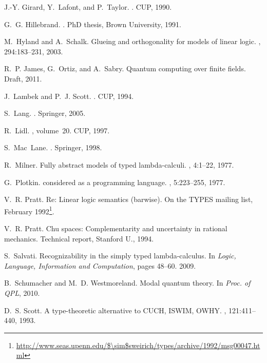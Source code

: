 \documentclass[10pt]{article}
\theoremstyle{plain}
\theoremstyle{definition}
\begin{document}
\begin{thebibliography}{10}
J.-Y. Girard, Y.~Lafont, and P.~Taylor.
.
\newblock CUP, 1990.

G.~G. Hillebrand.
.
\newblock PhD thesis, Brown University, 1991.

M.~Hyland and A.~Schalk.
\newblock Glueing and orthogonality for models of linear logic.
, 294:183--231, 2003.

R.~P. James, G.~Ortiz, and A.~Sabry.
\newblock Quantum computing over finite fields.
\newblock Draft, 2011.

J.~Lambek and P.~J. Scott.
.
\newblock CUP, 1994.

S.~Lang.
.
\newblock Springer, 2005.

R.~Lidl.
, volume~20.
\newblock CUP, 1997.

S.~Mac~Lane.
.
\newblock Springer, 1998.

R.~Milner.
\newblock Fully abstract models of typed lambda-calculi.
, 4:1--22, 1977.

G.~Plotkin.
 considered as a programming language.
, 5:223--255, 1977.

V.~R. Pratt.
\newblock Re: Linear logic semantics (barwise).
\newblock On the {TYPES} mailing list, February 1992\footnote{\scriptsize \url{http://www.seas.upenn.edu/$\sim$sweirich/types/archive/1992/msg00047.html}}.

V.~R. Pratt.
\newblock Chu spaces: Complementarity and uncertainty in rational mechanics.
\newblock Technical report, Stanford U., 1994.

S.~Salvati.
\newblock Recognizability in the simply typed lambda-calculus.
\newblock In {\em Logic, Language, Information and Computation}, pages 48--60.
  2009.

B.~Schumacher and M.~D. Westmoreland.
\newblock Modal quantum theory.
\newblock In {\em Proc. of QPL}, 2010.

D.~S. Scott.
\newblock A type-theoretic alternative to {CUCH}, {ISWIM}, {OWHY}.
, 121:411--440, 1993.


\end{thebibliography}
\end{document}
